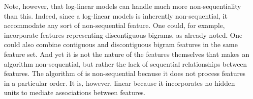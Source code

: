 {Note, however, that log-linear models can handle much more non-sequentiality than this. Indeed, since a log-linear models is inherently non-sequential, it accommodate any sort of non-sequential feature. 
One could, for example, incorporate
features representing discontiguous bigrams,
as already noted.
 One could also combine contiguous and discontiguous bigram features in the same feature set.
And yet it is not the nature of the features themselves that makes an algorithm non-sequential, but rather the lack of sequential relationships between features. The algorithm of \cite{poon-et-al:2009} is non-sequential because it does not process features in a particular order.
It is, however, linear because it incorporates no hidden units to mediate associations between features.


}
